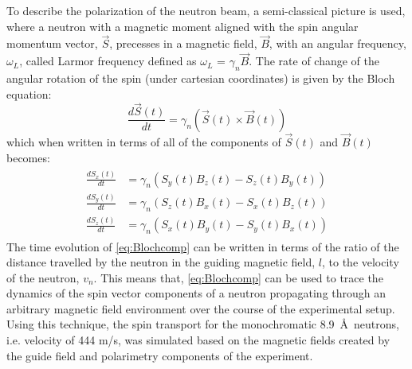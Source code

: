 To describe the polarization of the neutron beam, a semi-classical picture is used, where a neutron with a magnetic moment aligned with the spin angular momentum vector, $\Vec{S}$, precesses in a magnetic field, $\Vec{B}$, with an angular frequency, $\omega_L$, called Larmor frequency defined as $\omega_L$ = $\gamma_n \Vec{B}$. The rate of change of the angular rotation of the spin (under cartesian coordinates) is given by the Bloch equation\cite{Bloch1946}:
\begin{equation}
    \frac{d\Vec{S}(t)}{dt} = \gamma_n \left( \Vec{S}(t) \times \Vec{B}(t)  \right)
    \label{eq:Bloch}
\end{equation}
which when written in terms of all of the components of $\Vec{S}(t)$ and $\Vec{B}(t)$ becomes:
\begin{align}
\begin{split}
    \frac{dS_x(t)}{dt} &= \gamma_n \left( S_y(t) B_z(t) - S_z(t) B_y(t) \right) \\
    \frac{dS_y(t)}{dt} &= \gamma_n \left( S_z(t) B_x(t) - S_x(t) B_z(t) \right) \\
    \frac{dS_z(t)}{dt} &= \gamma_n \left( S_x(t) B_y(t) - S_y(t) B_x(t) \right)
    \label{eq:Blochcomp}
\end{split}
\end{align}
The time evolution of \cref{eq:Blochcomp} can be written in terms of the ratio of the distance travelled by the neutron in the guiding magnetic field, $l$, to the velocity of the neutron, $v_n$. This means that, \cref{eq:Blochcomp} can be used to trace the dynamics of the spin vector components of a neutron propagating through an arbitrary magnetic field environment over the course of the experimental setup. Using this technique, the spin transport for the monochromatic 8.9~\AA\ neutrons, i.e. velocity of 444 m/s, was simulated based on the magnetic fields created by the guide field and polarimetry components of the experiment.


